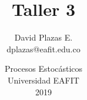 \documentclass[11pt,letterpaper]{article}%
\title{\vspace{-1cm}Taller 3}
\author{David Plazas E. \\dplazas@eafit.edu.co}
\date{\vspace{-0.5cm}Procesos Estocásticos\\Universidad EAFIT\\2019}
\begin{document}
%

%
\begin{center}


\end{center}
\end{document}
